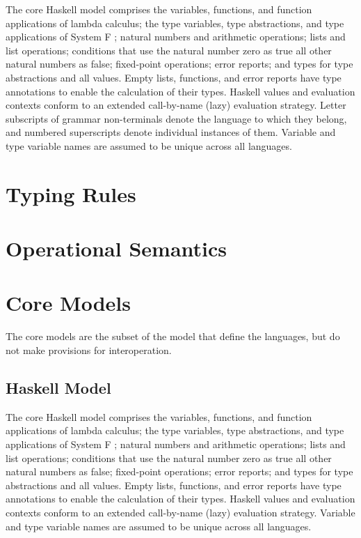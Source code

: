 The core Haskell model comprises the variables, functions, and function applications of lambda calculus; the type variables, type abstractions, and type applications of System F \cite{pierce02}; natural numbers and arithmetic operations; lists and list operations; conditions that use the natural number zero as true all other natural numbers as false; fixed-point operations; error reports; and types for type abstractions and all values.  Empty lists, functions, and error reports have type annotations to enable the calculation of their types.  Haskell values and evaluation contexts conform to an extended call-by-name (lazy) evaluation strategy.  Letter subscripts of grammar non-terminals denote the language to which they belong, and numbered superscripts denote individual instances of them.  Variable and type variable names are assumed to be unique across all languages.

\section{Typing Rules}



\section{Operational Semantics}



\section{Core Models}

The core models are the subset of the model that define the languages, but do not make provisions for interoperation.

\subsection{Haskell Model}

The core Haskell model comprises the variables, functions, and function applications of lambda calculus; the type variables, type abstractions, and type applications of System F \cite{pierce02}; natural numbers and arithmetic operations; lists and list operations; conditions that use the natural number zero as true all other natural numbers as false; fixed-point operations; error reports; and types for type abstractions and all values.  Empty lists, functions, and error reports have type annotations to enable the calculation of their types.  Haskell values and evaluation contexts conform to an extended call-by-name (lazy) evaluation strategy.  Variable and type variable names are assumed to be unique across all languages.

